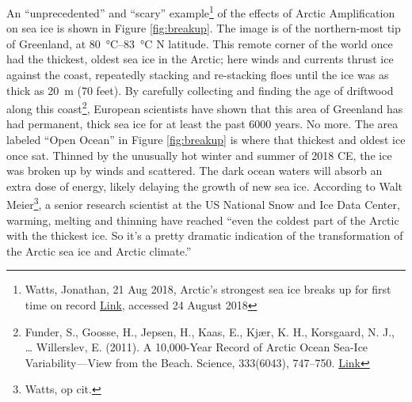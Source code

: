 \documentclass[amstex,12pt]{book}
\begin{document}
An ``unprecedented'' and ``scary'' example\footnote{Watts, Jonathan, 21 Aug 2018, Arctic's strongest sea ice breaks up for first time on record \href{https://www.theguardian.com/world/2018/aug/21/arctics-strongest-sea-ice-breaks-up-for-first-time-on-record}{Link}, accessed 24 August 2018} of the effects of Arctic Amplification on sea ice is shown in Figure \ref{fig:breakup}. The image is of the northern-most tip of Greenland, at \SIrange{80}{83}{\celsius} N latitude. This remote corner of the world once had the thickest, oldest sea ice in the Arctic; here winds and currents thrust ice against the coast, repeatedly stacking and re-stacking floes until the ice was as thick as \SI{20}{\metre} (70 feet). By carefully collecting and finding the age of driftwood along this coast\footnote{Funder, S., Goosse, H., Jepsen, H., Kaas, E., Kjær, K. H., Korsgaard, N. J., … Willerslev, E. (2011). A 10,000-Year Record of Arctic Ocean Sea-Ice Variability—View from the Beach. Science, 333(6043), 747–750. \href{https://doi.org/10.1126/science.1202760}{Link}}, European scientists have shown that this area of Greenland has had permanent, thick sea ice for at least the past 6000 years. No more. The area labeled ``Open Ocean'' in Figure \ref{fig:breakup} is where that thickest and oldest ice once sat. Thinned by the unusually hot winter and summer of 2018 CE, the ice was broken up by winds and scattered. The dark ocean waters will absorb an extra dose of energy, likely delaying the growth of new sea ice. According to Walt Meier\footnote{Watts, op cit.}, a senior research scientist at the US National Snow and Ice Data Center, warming, melting and thinning have reached ``even the coldest part of the Arctic with the thickest ice. So it’s a pretty dramatic indication of the transformation of the Arctic sea ice and Arctic climate.''\\  
\end{document}
